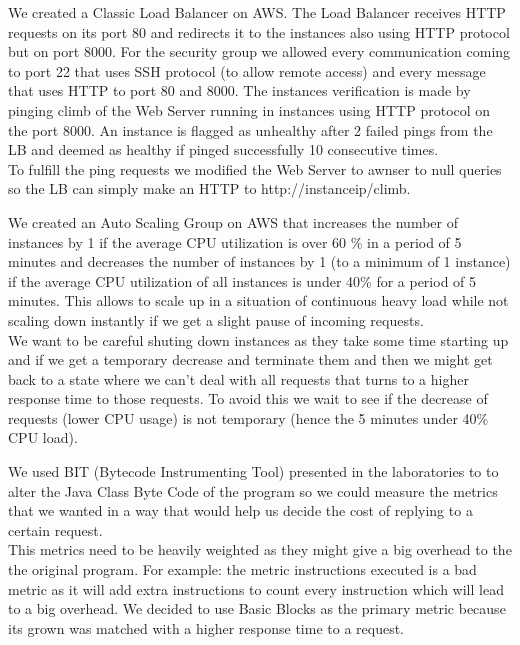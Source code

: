 \documentclass[times, 10pt,twocolumn]{article}
\begin{document}
   We created a Classic Load Balancer on AWS. The Load Balancer receives HTTP
   requests on its port 80 and redirects it to the instances also using HTTP
   protocol but on port 8000. For the security group we allowed every communication
   coming to port 22 that uses SSH protocol (to allow remote access) and every
   message that uses HTTP to port 80 and 8000. The instances verification is made 
   by pinging climb of the Web Server running in instances using HTTP protocol on
   the port 8000. An instance is flagged as unhealthy after 2 failed pings from the 
   LB and deemed as healthy if pinged successfully 10 consecutive times.\\
   To fulfill the ping requests we modified the Web Server to awnser to null queries
   so the LB can simply make an HTTP to http://instanceip/climb.
   
   We created an Auto Scaling Group on AWS that increases the number of instances by
   1 if the average CPU utilization is over 60 \% in a period of 5 minutes and
   decreases the number of instances by 1 (to a minimum of 1 instance) if the average CPU 
   utilization of all instances is under 40\% for a period of 5 minutes. This allows
   to scale up in a situation of continuous heavy load while not scaling down instantly
   if we get a slight pause of incoming requests. \\
   We want to be careful shuting down instances as they take some time starting up and if 
   we get a temporary decrease and terminate them and then we might get back to a state
   where we can't deal with all requests that turns to a higher response time to those 
   requests. To avoid this we wait to see if the decrease of requests (lower CPU usage)
   is not temporary (hence the 5 minutes under 40\% CPU load).

   We used BIT (Bytecode Instrumenting Tool) presented in the laboratories to 
   to alter the Java Class Byte Code of the program so we could measure the metrics
   that we wanted in a way that would help us decide the cost of replying to a certain request.\\
   This metrics need to be heavily weighted as they might give a big overhead to the 
   the original program. For example: the metric instructions executed is a bad metric
   as it will add extra instructions to count every instruction which will lead to a 
   big overhead.
   We decided to use Basic Blocks as the primary metric because its grown 
   was matched with a higher response time to a request. 
\end{document}
